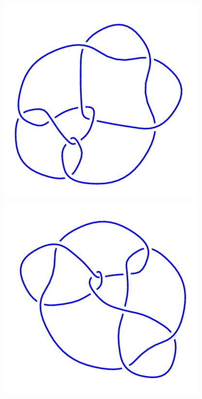 \begin{figure}[H]
\begin{minipage}[b]{.18\linewidth}
    \end{minipage}
    \begin{minipage}[b]{.18\linewidth}
        \centering
        \includegraphics[width=\linewidth]{../data/10_149.png}
    \end{minipage}
    \begin{minipage}[b]{.18\linewidth}
        \centering
        \includegraphics[width=\linewidth]{../data/10_150.png}

\end{minipage}
\end{figure}
